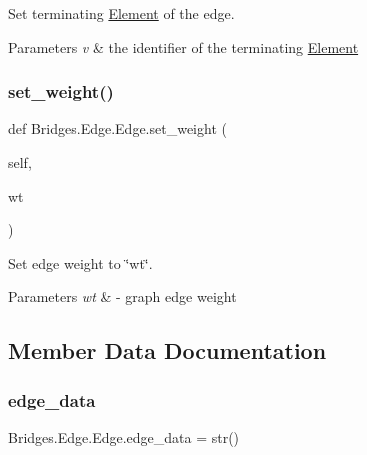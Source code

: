 Set terminating \mbox{\hyperlink{namespace_bridges_1_1_element}{Element}} of the edge. 


\begin{DoxyParams}{Parameters}
{\em v} & the identifier of the terminating \mbox{\hyperlink{namespace_bridges_1_1_element}{Element}} \\
\hline
\end{DoxyParams}
\mbox{\label{class_bridges_1_1_edge_1_1_edge_ac56a88d2be2c306f4b92e35923610d88}} 
\subsubsection{\texorpdfstring{set\+\_\+weight()}{set\_weight()}}
{\footnotesize\ttfamily def Bridges.\+Edge.\+Edge.\+set\+\_\+weight (\begin{DoxyParamCaption}\item[{}]{self,  }\item[{}]{wt }\end{DoxyParamCaption})}



Set edge weight to \char`\"{}wt\char`\"{}. 


\begin{DoxyParams}{Parameters}
{\em wt} & -\/ graph edge weight \\
\hline
\end{DoxyParams}


\subsection{Member Data Documentation}
\mbox{\label{class_bridges_1_1_edge_1_1_edge_ae97632efc0ced1c9530eab779d910d79}} 
\subsubsection{\texorpdfstring{edge\+\_\+data}{edge\_data}}
{\footnotesize\ttfamily Bridges.\+Edge.\+Edge.\+edge\+\_\+data = str()\hspace{0.3cm}{\ttfamily [static]}}

